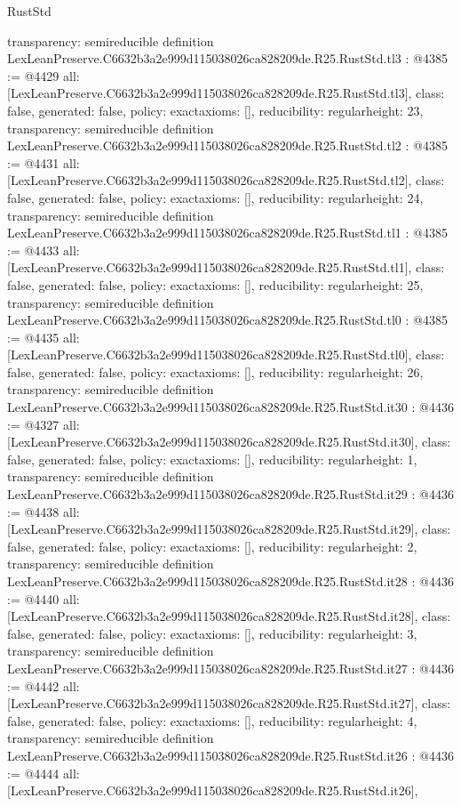 \begin{lexlean}{RustStd}
\begin{coremodule}
{  transparency: semireducible
}
definition LexLeanPreserve.C6632b3a2e999d115038026ca828209de.R25.RustStd.tl3 : @4385 := @4429 {
  all: [LexLeanPreserve.C6632b3a2e999d115038026ca828209de.R25.RustStd.tl3],
  class: false,
  generated: false,
  policy: exact{axioms: []},
  reducibility: regular{height: 23},
  transparency: semireducible
}
definition LexLeanPreserve.C6632b3a2e999d115038026ca828209de.R25.RustStd.tl2 : @4385 := @4431 {
  all: [LexLeanPreserve.C6632b3a2e999d115038026ca828209de.R25.RustStd.tl2],
  class: false,
  generated: false,
  policy: exact{axioms: []},
  reducibility: regular{height: 24},
  transparency: semireducible
}
definition LexLeanPreserve.C6632b3a2e999d115038026ca828209de.R25.RustStd.tl1 : @4385 := @4433 {
  all: [LexLeanPreserve.C6632b3a2e999d115038026ca828209de.R25.RustStd.tl1],
  class: false,
  generated: false,
  policy: exact{axioms: []},
  reducibility: regular{height: 25},
  transparency: semireducible
}
definition LexLeanPreserve.C6632b3a2e999d115038026ca828209de.R25.RustStd.tl0 : @4385 := @4435 {
  all: [LexLeanPreserve.C6632b3a2e999d115038026ca828209de.R25.RustStd.tl0],
  class: false,
  generated: false,
  policy: exact{axioms: []},
  reducibility: regular{height: 26},
  transparency: semireducible
}
definition LexLeanPreserve.C6632b3a2e999d115038026ca828209de.R25.RustStd.it30 : @4436 := @4327 {
  all: [LexLeanPreserve.C6632b3a2e999d115038026ca828209de.R25.RustStd.it30],
  class: false,
  generated: false,
  policy: exact{axioms: []},
  reducibility: regular{height: 1},
  transparency: semireducible
}
definition LexLeanPreserve.C6632b3a2e999d115038026ca828209de.R25.RustStd.it29 : @4436 := @4438 {
  all: [LexLeanPreserve.C6632b3a2e999d115038026ca828209de.R25.RustStd.it29],
  class: false,
  generated: false,
  policy: exact{axioms: []},
  reducibility: regular{height: 2},
  transparency: semireducible
}
definition LexLeanPreserve.C6632b3a2e999d115038026ca828209de.R25.RustStd.it28 : @4436 := @4440 {
  all: [LexLeanPreserve.C6632b3a2e999d115038026ca828209de.R25.RustStd.it28],
  class: false,
  generated: false,
  policy: exact{axioms: []},
  reducibility: regular{height: 3},
  transparency: semireducible
}
definition LexLeanPreserve.C6632b3a2e999d115038026ca828209de.R25.RustStd.it27 : @4436 := @4442 {
  all: [LexLeanPreserve.C6632b3a2e999d115038026ca828209de.R25.RustStd.it27],
  class: false,
  generated: false,
  policy: exact{axioms: []},
  reducibility: regular{height: 4},
  transparency: semireducible
}
definition LexLeanPreserve.C6632b3a2e999d115038026ca828209de.R25.RustStd.it26 : @4436 := @4444 {
  all: [LexLeanPreserve.C6632b3a2e999d115038026ca828209de.R25.RustStd.it26],
}
\end{coremodule}
\end{lexlean}
